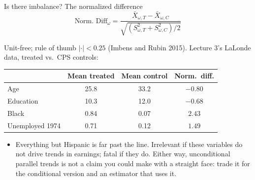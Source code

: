 \documentclass[
  11pt,
  ignorenonframetext,
  aspectratio=169,
]{beamer}
\providecommand{\tightlist}{%
  \setlength{\itemsep}{0pt}\setlength{\parskip}{0pt}}
\begin{document}
\begin{frame}{Is there imbalance? The normalized difference}
\protect{}\label{is-there-imbalance-the-normalized-difference}
\[
\text{Norm.\ Diff}_\omega = \frac{\bar X_{\omega,T} - \bar X_{\omega,C}}{\sqrt{(S^2_{\omega,T} + S^2_{\omega,C})/2}}
\]

Unit-free; rule of thumb \(|{\cdot}| < 0.25\) (Imbens and Rubin 2015).
Lecture 3's LaLonde data, treated vs.~CPS controls:

\begin{center}\small
\begin{tabular}{lccc}
\toprule
 & Mean treated & Mean control & Norm.\ diff. \\
\midrule
Age & 25.8 & 33.2 & $-0.80$ \\
Education & 10.3 & 12.0 & $-0.68$ \\
Black & 0.84 & 0.07 & $2.43$ \\
Unemployed 1974 & 0.71 & 0.12 & $1.49$ \\
\bottomrule
\end{tabular}
\end{center}

\begin{itemize}
\tightlist
\item
  Everything but Hispanic is far past the line. Irrelevant if these
  variables do not drive trends in earnings; fatal if they do. Either
  way, unconditional parallel trends is not a claim you could make with
  a straight face: trade it for the conditional version and an estimator
  that uses it.
\end{itemize}
\end{frame}
\end{document}
